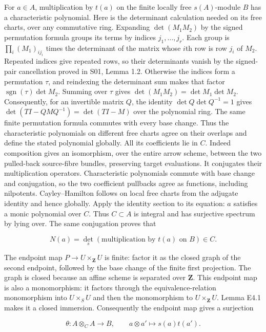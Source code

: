\documentclass[11pt,a4paper,openany]{report}
\begin{document}
For \(a\in A\), multiplication by \(t(a)\) on the finite locally free \(s(A)\)-module \(B\) has a characteristic polynomial. Here is the determinant calculation needed on its free charts, over any commutative ring. Expanding \(\det(M_1M_2)\) by the signed permutation formula groups its terms by indices \(j_1,\ldots,j_r\). Each group is \(\prod_i(M_1)_{i j_i}\) times the determinant of the matrix whose \(i\)th row is row \(j_i\) of \(M_2\). Repeated indices give repeated rows, so their determinants vanish by the signed-pair cancellation proved in S01, Lemma 1.2. Otherwise the indices form a permutation \(\tau\), and reindexing the determinant sum makes that factor \(\operatorname{sgn}(\tau)\det M_2\). Summing over \(\tau\) gives \(\det(M_1M_2)=\det M_1\det M_2\). Consequently, for an invertible matrix \(Q\), the identity \(\det Q\det Q^{-1}=1\) gives \(\det(TI-QMQ^{-1})=\det(TI-M)\) over the polynomial ring. The same finite permutation formula commutes with every base change. Thus the characteristic polynomials on different free charts agree on their overlaps and define the stated polynomial globally. All its coefficients lie in \(C\). Indeed composition gives an isomorphism, over the entire arrow scheme, between the two pulled-back source-fibre bundles, preserving target evaluations. It conjugates their multiplication operators. Characteristic polynomials commute with base change and conjugation, so the two coefficient pullbacks agree as functions, including nilpotents. Cayley--Hamilton follows on local free charts from the adjugate identity and hence globally. Apply the identity section to its equation: \(a\) satisfies a monic polynomial over \(C\). Thus \(C\subset A\) is integral and has surjective spectrum by lying over. The same conjugation proves that

\[
N(a)=\det_s(\text{multiplication by }t(a)\text{ on }B)\in C.
\]

The endpoint map \(P\to U\times_{\mathbf Z}U\) is finite: factor it as the closed graph of the second endpoint, followed by the base change of the finite first projection. The graph is closed because an affine scheme is separated over \(\mathbf Z\). This endpoint map is also a monomorphism: it factors through the equivalence-relation monomorphism into \(U\times_S U\) and then the monomorphism to \(U\times_{\mathbf Z}U\). Lemma E4.1 makes it a closed immersion. Consequently the endpoint map gives a surjection

\[
\theta:A\otimes_C A\longrightarrow B,\qquad
a\otimes a'\longmapsto s(a)t(a').
\]
\end{document}

